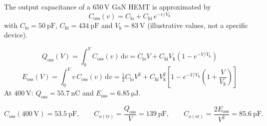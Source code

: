 


The output capacitance of a 650\,V GaN HEMT is approximated by
\begin{equation*}
	C_\mathrm{oss}(v) = C_\mathrm{lo} + C_\mathrm{hi}\,e^{-v/V_\mathrm{k}}
\end{equation*}
with $C_\mathrm{lo}=\SI{50}{\pico\farad}$, $C_\mathrm{hi}=\SI{434}{\pico\farad}$ and $V_\mathrm{k}=\SI{83}{\volt}$ (illustrative values, not a specific device).


\begin{solutionblock}
	\begin{equation}
		Q_\mathrm{oss}(V) = \int_0^V C_\mathrm{oss}(v)\,\mathrm{d}v = C_\mathrm{lo}V + C_\mathrm{hi}V_\mathrm{k}\left(1-e^{-V/V_\mathrm{k}}\right)
	\end{equation}
	\begin{equation}
		E_\mathrm{oss}(V) = \int_0^V v\,C_\mathrm{oss}(v)\,\mathrm{d}v = \tfrac{1}{2}C_\mathrm{lo}V^2 + C_\mathrm{hi}V_\mathrm{k}^2\left[1-e^{-V/V_\mathrm{k}}\left(1+\frac{V}{V_\mathrm{k}}\right)\right]
	\end{equation}
	At $\SI{400}{\volt}$: $Q_\mathrm{oss}=\SI{55.7}{\nano\coulomb}$ and $E_\mathrm{oss}=\SI{6.85}{\micro\joule}$.
\end{solutionblock}


\begin{solutionblock}
	\begin{equation}
		C_\mathrm{oss}(\SI{400}{\volt}) = \SI{53.5}{\pico\farad},\qquad
		C_\mathrm{o(tr)} = \frac{Q_\mathrm{oss}}{V} = \SI{139}{\pico\farad},\qquad
		C_\mathrm{o(er)} = \frac{2E_\mathrm{oss}}{V^2} = \SI{85.6}{\pico\farad}.
	\end{equation}
\end{solutionblock}

